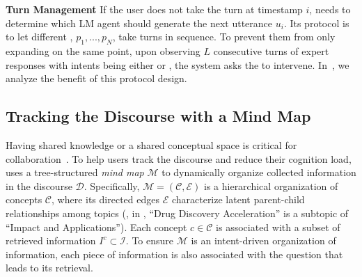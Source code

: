 \documentclass[11pt]{article}
\begin{document}
\noindent
\textbf{Turn Management}\quad
If the user does not take the turn at timestamp $i$, \system needs to determine which LM agent should generate the next utterance $u_i$. Its protocol is to let different \experts, $p_1, ..., p_N$, take turns in sequence. To prevent them from only expanding on the same point, upon observing $L$ consecutive turns of expert responses with intents being either  or , the system asks the \moderator to intervene.
In~, we analyze the benefit of this protocol design.




\subsection{Tracking the Discourse with a Mind Map}
\label{sec:mind_map}

Having shared knowledge or a shared conceptual space is critical for collaboration~\citep{roschelle1995construction}. To help users track the discourse and reduce their cognition load, \system uses a tree-structured \textit{mind map} $\mathcal{M}$ to dynamically organize collected information in the discourse $\mathcal{D}$. 
Specifically, $\mathcal{M} = (\mathcal{C}, \mathcal{E})$ is a hierarchical organization of concepts $\mathcal{C}$, where its directed edges $\mathcal{E}$ characterize latent parent-child relationships among topics (\eg, in , ``Drug Discovery Acceleration'' is a subtopic of ``Impact and Applications''). Each concept $c\in\mathcal{C}$ is associated with a subset of retrieved information $I^{c}\subset\mathcal{I}$. To ensure $\mathcal{M}$ is an intent-driven organization of information, each piece of information is also associated with the question that leads to its retrieval.
\end{document}
